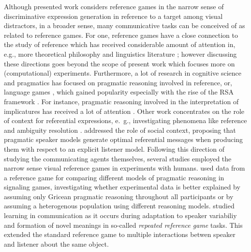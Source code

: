 Although presented work considers reference games in the narrow sense of discriminative expression generation in reference to a target among visual distractors, in a broader sense, many communicative tasks can be conceived of as related to reference games. 
For one, reference games have a close connection to the study of reference which has received considerable amount of attention in, e.g., more theoretical philosophy and linguistics literature \parencite[e.~g., ][]{searle1969speech, krifka2008basic, sep-reference}; however discussing these directions goes beyond the scope of present work which focuses more on (computational) experiments. 
Furthermore, a lot of research in cognitive science and pragmatics has focused on pragmatic reasoning involved in reference, or, language games \parencite[e.~g.,][]{frank2012predicting, wittgenstein2010philosophical}, which gained popularity especially with the rise of the RSA framework \parencite{goodman2016pragmatic}.  
For instance, pragmatic reasoning involved in the interpretation of implicatures has received a lot of attention \parencite[e.~g.,][]{bergen2016pragmatic, rothschild2013game, van2012explaining}.
Other work concentrates on the role of context for referential expressions, e.~g., investigating phenomena like reference and ambiguity resolution \parencite{frank2016rational, potts2016embedded}. \cite{golland2010game} addressed the role of social context, proposing that pragmatic speaker models generate optimal referential messages when producing them with respect to an explicit listener model. 
Following this direction of studying the communicating agents themselves, several studies employed the narrow sense visual reference games in experiments with humans. \cite{franke2016reasoning} used data from a reference game for comparing different models of pragmatic reasoning in signaling games, investigating whether experimental data is better explained by assuming only Gricean pragmatic reasoning throughout all participants or by assuming a heterogenous population using different reasoning models. %
\cite{hawkins2020characterizing} studied learning in communication as it occurs during adaptation to speaker variabiliy and formation of novel meanings in so-called \emph{repeated reference game} tasks. This extended the standard reference game to multiple interactions betwen speaker and listener about the same object. 


